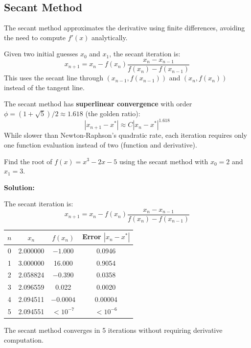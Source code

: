 \subsection{Secant Method}

The secant method approximates the derivative using finite differences, avoiding the need to compute $f'(x)$ analytically.

\begin{definitionbox}[title=Definition 11.6: Secant Method]
Given two initial guesses $x_0$ and $x_1$, the secant iteration is:
\begin{equation}
\boxed{x_{n+1} = x_n - f(x_n) \frac{x_n - x_{n-1}}{f(x_n) - f(x_{n-1})}}
\end{equation}
This uses the secant line through $(x_{n-1}, f(x_{n-1}))$ and $(x_n, f(x_n))$ instead of the tangent line.
\end{definitionbox}

\begin{keyconceptbox}[title=Secant Method Convergence]
The secant method has \textbf{superlinear convergence} with order $\phi = (1 + \sqrt{5})/2 \approx 1.618$ (the golden ratio):
\begin{equation}
|x_{n+1} - x^*| \approx C |x_n - x^*|^{1.618}
\end{equation}
While slower than Newton-Raphson's quadratic rate, each iteration requires only one function evaluation instead of two (function and derivative).
\end{keyconceptbox}

\begin{examplebox}[title=Example 11.3: Secant Method Iteration]
Find the root of $f(x) = x^3 - 2x - 5$ using the secant method with $x_0 = 2$ and $x_1 = 3$.

\textbf{Solution:}

The secant iteration is:
\begin{equation*}
x_{n+1} = x_n - f(x_n) \frac{x_n - x_{n-1}}{f(x_n) - f(x_{n-1})}
\end{equation*}

\begin{center}
\begin{tabular}{cccc}
\toprule
$n$ & $x_n$ & $f(x_n)$ & Error $|x_n - x^*|$ \\
\midrule
0 & 2.000000 & $-1.000$ & 0.0946 \\
1 & 3.000000 & 16.000 & 0.9054 \\
2 & 2.058824 & $-0.390$ & 0.0358 \\
3 & 2.096559 & 0.022 & 0.0020 \\
4 & 2.094511 & $-0.0004$ & 0.00004 \\
5 & 2.094551 & $< 10^{-7}$ & $< 10^{-6}$ \\
\bottomrule
\end{tabular}
\end{center}

The secant method converges in 5 iterations without requiring derivative computation.
\end{examplebox}

